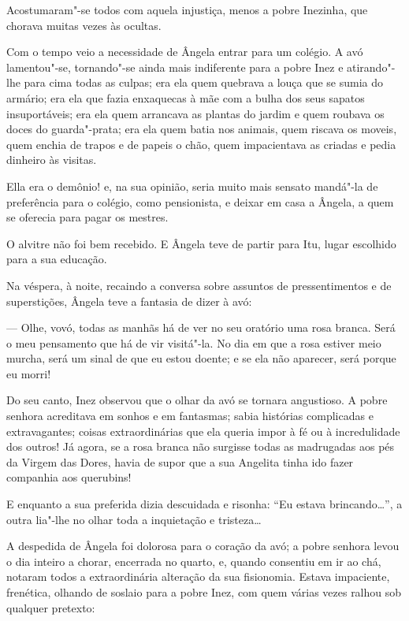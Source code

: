 Acostumaram"-se todos com aquela injustiça, menos a pobre Inezinha, que
chorava muitas vezes às ocultas.

Com o tempo veio a necessidade de Ângela entrar para um colégio. A avó
lamentou"-se, tornando"-se ainda mais indiferente para a pobre Inez e
atirando"-lhe para cima todas as culpas; era ela quem quebrava a louça
que se sumia do armário; era ela que fazia enxaquecas à mãe com a bulha
dos seus sapatos insuportáveis; era ela quem arrancava as plantas do
jardim e quem roubava os doces do guarda"-prata; era ela quem batia nos
animais, quem riscava os moveis, quem enchia de trapos e de papeis o
chão, quem impacientava as criadas e pedia dinheiro às visitas.

Ella era o demônio! e, na sua opinião, seria muito mais sensato mandá"-la
de preferência para o colégio, como pensionista, e deixar em casa a
Ângela, a quem se oferecia para pagar os mestres.

O alvitre não foi bem recebido. E Ângela teve de partir para Itu, lugar
escolhido para a sua educação.

Na véspera, à noite, recaindo a conversa sobre assuntos de
pressentimentos e de superstições, Ângela teve a fantasia de dizer à
avó:

--- Olhe, vovó, todas as manhãs há de ver no seu oratório uma rosa
branca. Será o meu pensamento que há de vir visitá"-la. No dia em que a
rosa estiver meio murcha, será um sinal de que eu estou doente; e se ela
não aparecer, será porque eu morri!

Do seu canto, Inez observou que o olhar da avó se tornara angustioso. A
pobre senhora acreditava em sonhos e em fantasmas; sabia histórias
complicadas e extravagantes; coisas extraordinárias que ela queria impor
à fé ou à incredulidade dos outros! Já agora, se a rosa branca não
surgisse todas as madrugadas aos pés da Virgem das Dores, havia de supor
que a sua Angelita tinha ido fazer companhia aos querubins!

E enquanto a sua preferida dizia descuidada e risonha: ``Eu estava
brincando\ldots{}'', a outra lia"-lhe no olhar toda a inquietação e
tristeza\ldots{}

A despedida de Ângela foi dolorosa para o coração da avó; a pobre
senhora levou o dia inteiro a chorar, encerrada no quarto, e, quando
consentiu em ir ao chá, notaram todos a extraordinária alteração da sua
fisionomia. Estava impaciente, frenética, olhando de soslaio para a
pobre Inez, com quem várias vezes ralhou sob qualquer pretexto:

